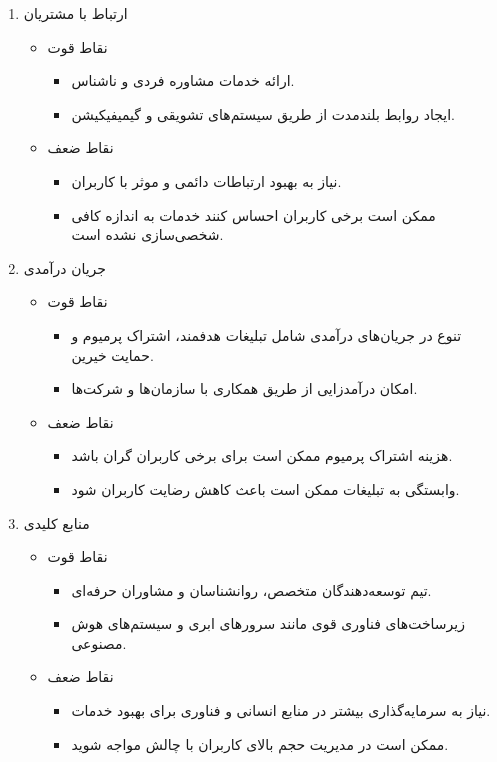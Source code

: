 \documentclass[dvipsnames, svgnames, x11names, 11pt]{article}
\begin{document}
\begin{enumerate}
\item 
ارتباط با مشتریان 
\begin{itemize}
\item 
نقاط قوت
\begin{itemize}
\item 
ارائه خدمات مشاوره فردی و ناشناس.
\item 
ایجاد روابط بلندمدت از طریق سیستم‌های تشویقی و گیمیفیکیشن.
\end{itemize}

\item 
نقاط ضعف
\begin{itemize}
\item
نیاز به بهبود ارتباطات دائمی و موثر با کاربران.
\item 
ممکن است برخی کاربران احساس کنند خدمات به اندازه کافی شخصی‌سازی نشده است.
\end{itemize}
\end{itemize}

\item 
جریان درآمدی 
\begin{itemize}
\item 
نقاط قوت
\begin{itemize}
\item 
تنوع در جریان‌های درآمدی شامل تبلیغات هدفمند، اشتراک پرمیوم و حمایت خیرین.
\item 
امکان درآمدزایی از طریق همکاری با سازمان‌ها و شرکت‌ها.
\end{itemize}
\item 
نقاط ضعف
\begin{itemize}
\item 
هزینه اشتراک پرمیوم ممکن است برای برخی کاربران گران باشد.
\item 
وابستگی به تبلیغات ممکن است باعث کاهش رضایت کاربران شود.
\end{itemize}
\end{itemize}


\item 
منابع کلیدی 
\begin{itemize}
\item 
نقاط قوت
\begin{itemize}
\item 
تیم توسعه‌دهندگان متخصص، روانشناسان و مشاوران حرفه‌ای.
\item 
زیرساخت‌های فناوری قوی مانند سرورهای ابری و سیستم‌های هوش مصنوعی.
\end{itemize}
\item 
نقاط ضعف
\begin{itemize}
\item 
نیاز به سرمایه‌گذاری بیشتر در منابع انسانی و فناوری برای بهبود خدمات.
\item 
ممکن است در مدیریت حجم بالای کاربران با چالش مواجه شوید.
\end{itemize}
\end{itemize}


\end{enumerate}
\end{document}

